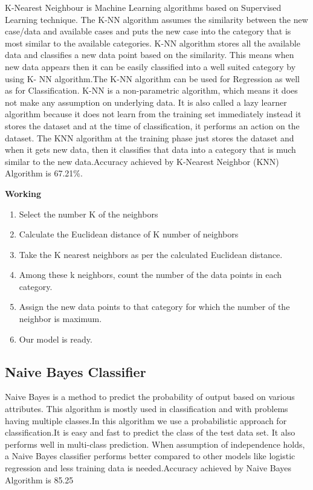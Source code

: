 \documentclass{article}
\begin{document}
K-Nearest Neighbour is Machine Learning algorithms based on Supervised Learning technique.
The K-NN algorithm assumes the similarity between the new case/data and available cases and puts the new case into the category that is most similar to the available categories.
K-NN algorithm stores all the available data and classifies a new data point based on the similarity. This means when new data appears then it can be easily classified into a well suited category by using K- NN algorithm.The K-NN algorithm can be used for Regression as well as for Classification. K-NN is a non-parametric algorithm, which means it does not make any assumption on underlying data. It is also called a lazy learner algorithm because it does not learn from the training set immediately instead it stores the dataset and at the time of classification, it performs an action on the dataset. The KNN algorithm at the training phase just stores the dataset and when it gets new data, then it classifies that data into a category that is much similar to the new data.Accuracy achieved by K-Nearest Neighbor (KNN) Algorithm is 67.21\%.

\textbf{Working}
\begin{enumerate}
    \item Select the number K of the neighbors
    \item Calculate the Euclidean distance of K number of neighbors
    \item Take the K nearest neighbors as per the calculated Euclidean distance.
    \item Among these k neighbors, count the number of the data points in each category.
    \item Assign the new data points to that category for which the number of the neighbor is maximum.
    \item Our model is ready.
\end{enumerate}


\subsection{Naive Bayes Classifier }
Naive Bayes is a method to predict the probability of output based on various attributes. This algorithm is mostly used in classification and with problems having multiple classes.In this algorithm we use a probabilistic approach for classification.It is easy and fast to predict the class of the test data set. It also performs well in multi-class prediction. When assumption of independence holds, a Naive Bayes classifier performs better compared to other models like logistic regression and less training data is needed.Accuracy achieved by Naive Bayes Algorithm is 85.25%
\end{document}
